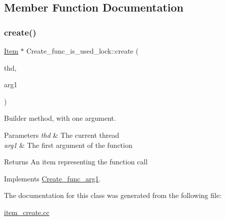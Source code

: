 \subsection{Member Function Documentation}
\mbox{\label{classCreate__func__is__used__lock_a99fd30eacf376485a6cf4a176b4b1ff9}} 
\subsubsection{\texorpdfstring{create()}{create()}}
{\footnotesize\ttfamily \mbox{\hyperlink{classItem}{Item}} $\ast$ Create\+\_\+func\+\_\+is\+\_\+used\+\_\+lock\+::create (\begin{DoxyParamCaption}\item[{T\+HD $\ast$}]{thd,  }\item[{\mbox{\hyperlink{classItem}{Item}} $\ast$}]{arg1 }\end{DoxyParamCaption})\hspace{0.3cm}{\ttfamily [virtual]}}

Builder method, with one argument. 
\begin{DoxyParams}{Parameters}
{\em thd} & The current thread \\
\hline
{\em arg1} & The first argument of the function \\
\hline
\end{DoxyParams}
\begin{DoxyReturn}{Returns}
An item representing the function call 
\end{DoxyReturn}


Implements \mbox{\hyperlink{classCreate__func__arg1_a3e9a98f755cd82c3e762e334c955a8c9}{Create\+\_\+func\+\_\+arg1}}.



The documentation for this class was generated from the following file\+:\begin{DoxyCompactItemize}
\item 
\mbox{\hyperlink{item__create_8cc}{item\+\_\+create.\+cc}}\end{DoxyCompactItemize}
